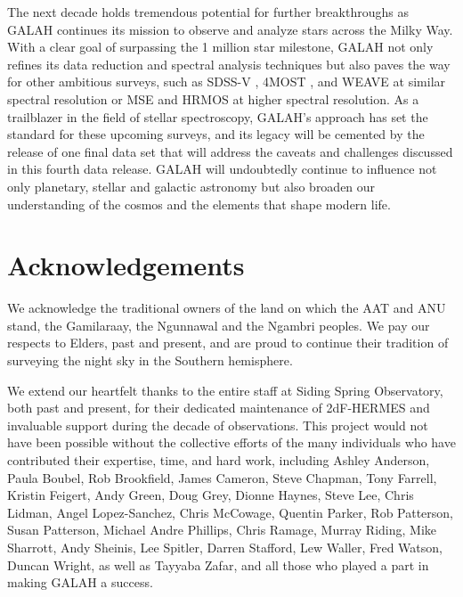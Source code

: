 \documentclass[
  journal=pasa,
  manuscript=research-paper, %
  year=2024,
  volume=37
]{cup-journal}
\begin{document}
The next decade holds tremendous potential for further breakthroughs as GALAH continues its mission to observe and analyze stars across the Milky Way. With a clear goal of surpassing the 1 million star milestone, GALAH not only refines its data reduction and spectral analysis techniques but also paves the way for other ambitious surveys, such as SDSS-V \citep{Kollmeier2017}, 4MOST \citep{4MOST2019}, and WEAVE \citep{Dalton2014} at similar spectral resolution or MSE \citep{MSE2019} and HRMOS \citep{HRMOS2023} at higher spectral resolution. As a trailblazer in the field of stellar spectroscopy, GALAH’s approach has set the standard for these upcoming surveys, and its legacy will be cemented by the release of one final data set that will address the caveats and challenges discussed in this fourth data release. GALAH will undoubtedly continue to influence not only planetary, stellar and galactic astronomy but also broaden our understanding of the cosmos and the elements that shape modern life.


\section*{Acknowledgements}

We acknowledge the traditional owners of the land on which the AAT and ANU stand, the Gamilaraay, the Ngunnawal and the Ngambri peoples. We pay our respects to Elders, past and present, and are proud to continue their tradition of surveying the night sky in the Southern hemisphere.

We extend our heartfelt thanks to the entire staff at Siding Spring Observatory, both past and present, for their dedicated maintenance of 2dF-HERMES and invaluable support during the decade of observations. This project would not have been possible without the collective efforts of the many individuals who have contributed their expertise, time, and hard work, including
Ashley Anderson, 
Paula Boubel, 
Rob Brookfield, 
James Cameron, 
Steve Chapman, 
Tony Farrell, 
Kristin Feigert, 
Andy Green, 
Doug Grey, 
Dionne Haynes, 
Steve Lee, 
Chris Lidman, 
Angel Lopez-Sanchez, 
Chris McCowage, 
Quentin Parker, 
Rob Patterson, 
Susan Patterson, 
Michael Andre Phillips, 
Chris Ramage, 
Murray Riding, 
Mike Sharrott, 
Andy Sheinis, 
Lee Spitler, 
Darren Stafford, 
Lew Waller, 
Fred Watson, 
Duncan Wright, 
as well as Tayyaba Zafar, 
and all those who played a part in making GALAH a success.
\end{document}
